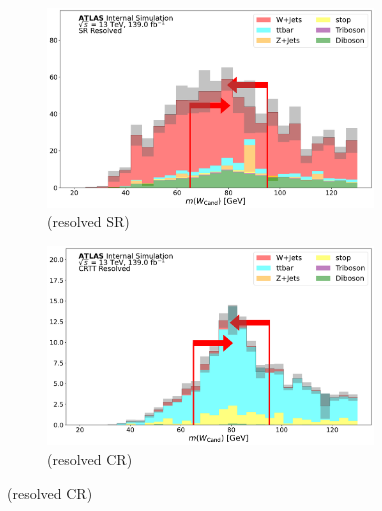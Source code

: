 \begin{figure}[htbp]
  \begin{subfigure}{0.45\textwidth}
     \includegraphics[width = 0.95\textwidth]{Figures/App_SR_CR_distributions/SR1L_Resolved/WCand_m_N_1.pdf}
    \caption{\Wcandm (resolved SR)}
     \end{subfigure}
    \begin{subfigure}{0.45\textwidth}
     \includegraphics[width = 0.95\textwidth]{Figures/App_SR_CR_distributions/CRTT_Resolved/WCand_m_N_1.pdf}
     \caption{\Wcandm (resolved \ttbar CR)}
     \end{subfigure}


\end{figure}
